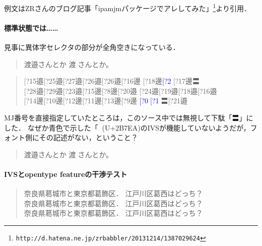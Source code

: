 \documentclass{ltjsarticle}
\makeatletter
\def\ltj@ivs@out#1#2{#2\char\numexpr "E0100+#1\relax} %
\def\ltj@ivs@list?#1{\directlua{list_ivs('#1')}}
\def\ltj@ivs@grab@num{\expandafter\expandafter\expandafter\ltj@ivs@out\ltj@grab@num}
\def\ltj@ivs@nobracket{\@ifnextchar?{\ltj@ivs@list}{\ltj@ivs@grab@num}}
\def\ltj@ivs@bracket[#1]{\ltj@ivs@nobracket#1}
\def\IVS{\@ifnextchar[{\ltj@ivs@bracket}{\ltj@ivs@nobracket}}
\let\MJI=\IVS
\makeatother
\begin{document}

例文はZRさんのブログ記事「ipamjmパッケージでアレしてみた」\footnote{%
\verb+http://d.hatena.ne.jp/zrbabbler/20131214/1387029624+}より引用．

\paragraph{標準状態では……} 見事に異体字セレクタの部分が全角空きになっている．
\begin{quote}
\LARGE
渡邉󠄏さんとか%
渡𫟪󠄂さんとか。%
\end{quote}


\begin{quote}
\LARGE
\MJI15{邉}\MJI25{邉}\MJI27{邉}\MJI26{邉}\MJI26{邉}\MJI16{邊}
\MJI18{邊}\textcolor{blue}{\MJI2{𫟪}}\MJI17{邊}〓\\
\MJI28{邉}\MJI29{邉}\MJI23{邉}\MJI15{邊}\MJI8{邊}\MJI20{邉}
\MJI24{邉}\MJI19{邉}\MJI18{邉}\MJI16{邉}\\
\MJI14{邊}\MJI10{邊}\MJI12{邊}\MJI11{邊}\MJI13{邊}\MJI9{邊}
\textcolor{blue}{\MJI0{𫟪}}\textcolor{blue}{\MJI1{𫟪}}〓\MJI21{邉}
\end{quote}
MJ番号を直接指定していたところは，このソース中では無視して下駄「〓」にした．
なぜか青色で示した「𫟪」(U+2B7EA)のIVSが機能していないようだが，フォント側にその記述がない，ということ？

\begin{quote}
\LARGE
渡邉󠄏さんとか%
渡𫟪󠄂さんとか。%
\end{quote}


\def\TEST{%
  奈良県葛󠄀城市と東京都葛󠄁飾区．%
  江戸川区葛西はどっち？
}

\paragraph{IVSとopentype featureの干渉テスト}

\begin{quote}
 \Large
 {\TEST}\\
 {\TEST}\\
 {\TEST}
\end{quote}
\end{document}
